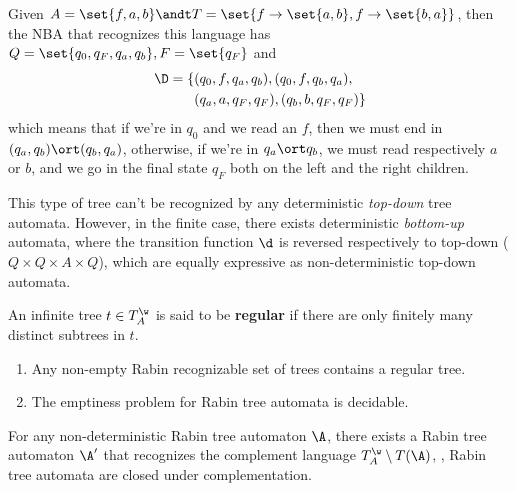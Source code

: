 \documentclass[oneside]{academica}
\begin{document}
\begin{exercise*}
  Given $A = \set{f,a,b} \andt T = \set{f\to\set{a,b},f\to\set{b,a}}$, then the NBA that recognizes this language has $Q = \set{q_0,q_F,q_a,q_b}, F=\set{q_F}$ and
  \begin{align*}
    \D = \{&(q_0,f,q_a,q_b), (q_0,f,q_b,q_a),\\
           &(q_a,a,q_F,q_F), (q_b,b,q_F,q_F)\}
  \end{align*}
  which means that if we're in $q_0$ and we read an $f$, then we must end in $(q_a,q_b) \ort (q_b,q_a)$, otherwise, if we're in $q_a \ort q_b$, we must read respectively $a$ or $b$, and we go in the final state $q_F$ both on the left and the right children.
  \begin{center}
    
  \end{center}
  This type of tree can't be recognized by any deterministic \emph{top-down} tree automata.
  However, in the finite case, there exists deterministic \emph{bottom-up} automata, where the transition function $\d$ is reversed respectively to top-down ($Q \times Q \times A \times Q$), which are equally expressive as non-deterministic top-down automata.
\end{exercise*}

\begin{definition*}
  An infinite tree $t \in \Twa$ is said to be \textbf{regular} if there are only finitely many distinct subtrees in $t$.
\end{definition*}

\begin{theorem*}
  \begin{enumerate}
    \item Any non-empty Rabin recognizable set of trees contains a regular tree.
    \item The emptiness problem for Rabin tree automata is decidable.
  \end{enumerate}
\end{theorem*}

\begin{proposition*}
  For any non-deterministic Rabin tree automaton $\A$, there exists a Rabin tree automaton $\A'$ that recognizes the complement language $\Twa \setminus T(\A)$, \ie, Rabin tree automata are closed under complementation.
\end{proposition*}
\end{document}
